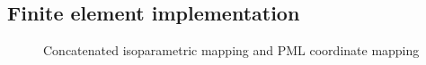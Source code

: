 \documentclass{article}
\newcommand{\sfC}{\mathsf{C}}
\newcommand{\note}[1]{\footnote{\textsc{To do}: #1}}
\begin{document}

\subsection{Finite element implementation}

\begin{figure}
  \scalebox{0.65}{}
  \caption{Concatenated isoparametric mapping and PML coordinate mapping}
  \label{isopml-fig}
\end{figure}
\end{document}
